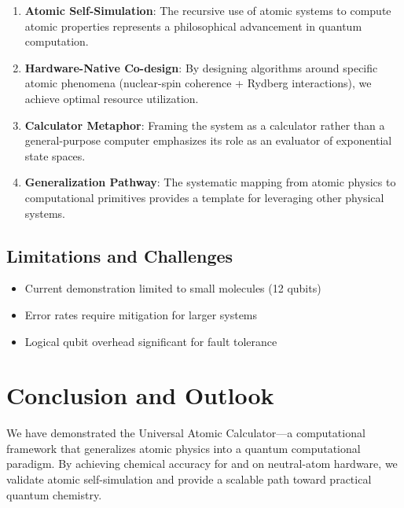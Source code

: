 \documentclass[12pt]{article}
\begin{document}
\begin{enumerate}
\item \textbf{Atomic Self-Simulation}: The recursive use of atomic systems to compute atomic properties represents a philosophical advancement in quantum computation.

\item \textbf{Hardware-Native Co-design}: By designing algorithms around specific atomic phenomena (nuclear-spin coherence + Rydberg interactions), we achieve optimal resource utilization.

\item \textbf{Calculator Metaphor}: Framing the system as a calculator rather than a general-purpose computer emphasizes its role as an evaluator of exponential state spaces.

\item \textbf{Generalization Pathway}: The systematic mapping from atomic physics to computational primitives provides a template for leveraging other physical systems.
\end{enumerate}

\subsection{Limitations and Challenges}
\begin{itemize}
\item Current demonstration limited to small molecules (12 qubits)
\item Error rates require mitigation for larger systems
\item Logical qubit overhead significant for fault tolerance
\end{itemize}

\section{Conclusion and Outlook}

We have demonstrated the Universal Atomic Calculator—a computational framework that generalizes atomic physics into a quantum computational paradigm. By achieving chemical accuracy for  and  on neutral-atom hardware, we validate atomic self-simulation and provide a scalable path toward practical quantum chemistry.
\end{document}
